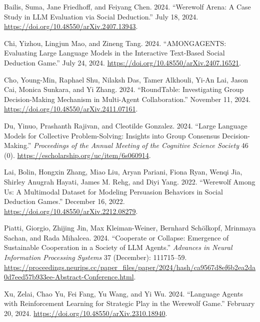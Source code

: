 \documentclass[
  letterpaper,
  DIV=11,
  numbers=noendperiod]{scrreprt}
\newlength{\cslhangindent}
\newenvironment{CSLReferences}[2] %
 {\begin{list}{}{%
  \setlength{\itemindent}{0pt}
  \setlength{\leftmargin}{0pt}
  \setlength{\parsep}{0pt}
  \ifodd #1
   \setlength{\leftmargin}{\cslhangindent}
   \setlength{\itemindent}{-1\cslhangindent}
  \fi
  \setlength{\itemsep}{#2\baselineskip}}}
 {\end{list}}
\begin{document}
\label{refs}
\begin{CSLReferences}{1}{0}
Bailis, Suma, Jane Friedhoff, and Feiyang Chen. 2024. {``Werewolf
{Arena}: {A Case Study} in {LLM Evaluation} via {Social Deduction}.''}
July 18, 2024. \url{https://doi.org/10.48550/arXiv.2407.13943}.

Chi, Yizhou, Lingjun Mao, and Zineng Tang. 2024. {``{AMONGAGENTS}:
{Evaluating Large Language Models} in the {Interactive Text-Based Social
Deduction Game}.''} July 24, 2024.
\url{https://doi.org/10.48550/arXiv.2407.16521}.

Cho, Young-Min, Raphael Shu, Nilaksh Das, Tamer Alkhouli, Yi-An Lai,
Jason Cai, Monica Sunkara, and Yi Zhang. 2024. {``{RoundTable}:
{Investigating Group Decision-Making Mechanism} in {Multi-Agent
Collaboration}.''} November 11, 2024.
\url{https://doi.org/10.48550/arXiv.2411.07161}.

Du, Yinuo, Prashanth Rajivan, and Cleotilde Gonzalez. 2024. {``Large
{Language Models} for {Collective Problem-Solving}: {Insights} into
{Group Consensus Decision-Making}.''} \emph{Proceedings of the Annual
Meeting of the Cognitive Science Society} 46 (0).
\url{https://escholarship.org/uc/item/6s060914}.

Lai, Bolin, Hongxin Zhang, Miao Liu, Aryan Pariani, Fiona Ryan, Wenqi
Jia, Shirley Anugrah Hayati, James M. Rehg, and Diyi Yang. 2022.
{``Werewolf {Among Us}: {A Multimodal Dataset} for {Modeling Persuasion
Behaviors} in {Social Deduction Games}.''} December 16, 2022.
\url{https://doi.org/10.48550/arXiv.2212.08279}.

Piatti, Giorgio, Zhijing Jin, Max Kleiman-Weiner, Bernhard Schölkopf,
Mrinmaya Sachan, and Rada Mihalcea. 2024. {``Cooperate or {Collapse}:
{Emergence} of {Sustainable Cooperation} in a {Society} of {LLM
Agents}.''} \emph{Advances in Neural Information Processing Systems} 37
(December): 111715--59.
\url{https://proceedings.neurips.cc/paper_files/paper/2024/hash/ca9567d8ef6b2ea2da0d7eed57b933ee-Abstract-Conference.html}.

Xu, Zelai, Chao Yu, Fei Fang, Yu Wang, and Yi Wu. 2024. {``Language
{Agents} with {Reinforcement Learning} for {Strategic Play} in the
{Werewolf Game}.''} February 20, 2024.
\url{https://doi.org/10.48550/arXiv.2310.18940}.

\end{CSLReferences}
\end{document}
